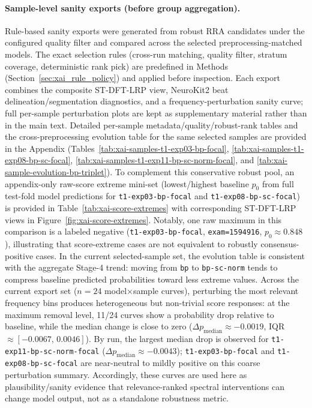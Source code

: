 \paragraph{Sample-level sanity exports (before group aggregation).}
Rule-based sanity exports were generated from robust RRA candidates under the configured quality filter and compared across the selected preprocessing-matched models.
The exact selection rules (cross-run matching, quality filter, stratum coverage, deterministic rank pick) are predefined in Methods (Section~\ref{sec:xai_rule_policy}) and applied before inspection.
Each export combines the composite ST-DFT-LRP view, NeuroKit2 beat delineation/segmentation diagnostics, and a frequency-perturbation sanity curve; full per-sample perturbation plots are kept as supplementary material rather than in the main text.
Detailed per-sample metadata/quality/robust-rank tables and the cross-preprocessing evolution table for the same selected samples are provided in the Appendix (Tables~\ref{tab:xai-samples-t1-exp03-bp-focal}, \ref{tab:xai-samples-t1-exp08-bp-sc-focal}, \ref{tab:xai-samples-t1-exp11-bp-sc-norm-focal}, and \ref{tab:xai-sample-evolution-bp-triplet}).
To complement this conservative robust pool, an appendix-only raw-score extreme mini-set (lowest/highest baseline \(p_0\) from full test-fold model predictions for \texttt{t1-exp03-bp-focal} and \texttt{t1-exp08-bp-sc-focal}) is provided in Table~\ref{tab:xai-score-extremes} with corresponding ST-DFT-LRP views in Figure~\ref{fig:xai-score-extremes}.
Notably, one raw maximum in this comparison is a labeled negative (\texttt{t1-exp03-bp-focal}, \texttt{exam=1594916}, \(p_0\approx0.848\)), illustrating that score-extreme cases are not equivalent to robustly consensus-positive cases.
In the current selected-sample set, the evolution table is consistent with the aggregate Stage-4 trend: moving from \texttt{bp} to \texttt{bp-sc-norm} tends to compress baseline predicted probabilities toward less extreme values.
Across the current export set (\(n=24\) model$\times$sample curves), perturbing the most relevant frequency bins produces heterogeneous but non-trivial score responses: at the maximum removal level, 11/24 curves show a probability drop relative to baseline, while the median change is close to zero (\(\Delta p_{\text{median}}\approx -0.0019\), IQR \(\approx[-0.0067,\,0.0046]\)).
By run, the largest median drop is observed for \texttt{t1-exp11-bp-sc-norm-focal} (\(\Delta p_{\text{median}}\approx -0.0043\)); \texttt{t1-exp03-bp-focal} and \texttt{t1-exp08-bp-sc-focal} are near-neutral to mildly positive on this coarse perturbation summary.
Accordingly, these curves are used here as plausibility/sanity evidence that relevance-ranked spectral interventions can change model output, not as a standalone robustness metric.

